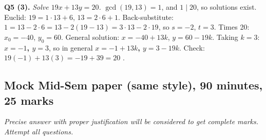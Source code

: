 \textbf{Q5 (3).} \emph{Solve $19x + 13y = 20$.}
$\gcd(19, 13) = 1$, and $1 \mid 20$, so solutions exist. Euclid: $19 = 1\cdot13 + 6$, $13 = 2\cdot6 + 1$. Back-substitute:
$1 = 13 - 2\cdot6 = 13 - 2(19 - 13) = 3\cdot13 - 2\cdot19$, so $s = -2$, $t = 3$.
Times 20: $x_0 = -40$, $y_0 = 60$. General solution: $x = -40 + 13k$, $y = 60 - 19k$. Taking $k = 3$: \textbf{$x = -1$, $y = 3$}, so in general \textbf{$x = -1 + 13k$, $y = 3 - 19k$}.
Check: $19(-1) + 13(3) = -19 + 39 = 20$ \checkmark.

\clearpage
\subsection{Mock Mid-Sem paper (same style), 90 minutes, 25 marks}
\emph{Precise answer with proper justification will be considered to get complete marks. Attempt all questions.}
